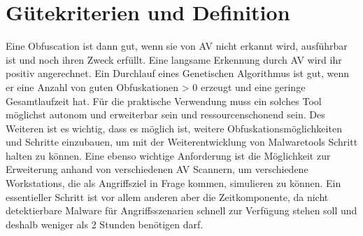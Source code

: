 \section{Gütekriterien und Definition}
\label{Methode:Kriterien}
Eine Obfuscation ist dann gut, wenn sie von AV nicht erkannt wird, ausführbar ist und noch ihren Zweck erfüllt. Eine langsame Erkennung durch AV wird ihr positiv angerechnet. Ein Durchlauf eines Genetischen Algorithmus ist gut, wenn er eine Anzahl von guten Obfuskationen > 0 erzeugt und eine geringe Gesamtlaufzeit hat.
Für die praktische Verwendung muss ein solches Tool möglichst autonom und erweiterbar sein und ressourcenschonend sein. Des Weiteren ist es wichtig, dass es möglich ist, weitere Obfuskationsmöglichkeiten und Schritte einzubauen, um mit der Weiterentwicklung von Malwaretools Schritt halten zu können. Eine ebenso wichtige Anforderung ist die Möglichkeit zur Erweiterung anhand von verschiedenen AV Scannern, um verschiedene Workstations, die als Angriffsziel in Frage kommen, simulieren zu können.
Ein essentieller Schritt ist vor allem anderen aber die Zeitkomponente, da nicht detektierbare Malware für Angriffsszenarien schnell zur Verfügung stehen soll und deshalb weniger als 2 Stunden benötigen darf.
